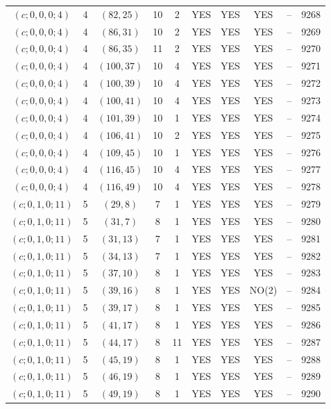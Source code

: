 \begin{longtable}{|c|c|c|c|c|c|c|c|c|c|}
$(c; 0, 0, 0; 4)$ & 4 & $(82, 25)$ & 10 & 2 & YES & YES & YES & -- & 9268\\
$(c; 0, 0, 0; 4)$ & 4 & $(86, 31)$ & 10 & 2 & YES & YES & YES & -- & 9269\\
$(c; 0, 0, 0; 4)$ & 4 & $(86, 35)$ & 11 & 2 & YES & YES & YES & -- & 9270\\
$(c; 0, 0, 0; 4)$ & 4 & $(100, 37)$ & 10 & 4 & YES & YES & YES & -- & 9271\\
$(c; 0, 0, 0; 4)$ & 4 & $(100, 39)$ & 10 & 4 & YES & YES & YES & -- & 9272\\
$(c; 0, 0, 0; 4)$ & 4 & $(100, 41)$ & 10 & 4 & YES & YES & YES & -- & 9273\\
$(c; 0, 0, 0; 4)$ & 4 & $(101, 39)$ & 10 & 1 & YES & YES & YES & -- & 9274\\
$(c; 0, 0, 0; 4)$ & 4 & $(106, 41)$ & 10 & 2 & YES & YES & YES & -- & 9275\\
$(c; 0, 0, 0; 4)$ & 4 & $(109, 45)$ & 10 & 1 & YES & YES & YES & -- & 9276\\
$(c; 0, 0, 0; 4)$ & 4 & $(116, 45)$ & 10 & 4 & YES & YES & YES & -- & 9277\\
$(c; 0, 0, 0; 4)$ & 4 & $(116, 49)$ & 10 & 4 & YES & YES & YES & -- & 9278\\
$(c; 0, 1, 0; 11)$ & 5 & $(29, 8)$ & 7 & 1 & YES & YES & YES & -- & 9279\\
$(c; 0, 1, 0; 11)$ & 5 & $(31, 7)$ & 8 & 1 & YES & YES & YES & -- & 9280\\
$(c; 0, 1, 0; 11)$ & 5 & $(31, 13)$ & 7 & 1 & YES & YES & YES & -- & 9281\\
$(c; 0, 1, 0; 11)$ & 5 & $(34, 13)$ & 7 & 1 & YES & YES & YES & -- & 9282\\
$(c; 0, 1, 0; 11)$ & 5 & $(37, 10)$ & 8 & 1 & YES & YES & YES & -- & 9283\\
$(c; 0, 1, 0; 11)$ & 5 & $(39, 16)$ & 8 & 1 & YES & YES & NO(2) & -- & 9284\\
$(c; 0, 1, 0; 11)$ & 5 & $(39, 17)$ & 8 & 1 & YES & YES & YES & -- & 9285\\
$(c; 0, 1, 0; 11)$ & 5 & $(41, 17)$ & 8 & 1 & YES & YES & YES & -- & 9286\\
$(c; 0, 1, 0; 11)$ & 5 & $(44, 17)$ & 8 & 11 & YES & YES & YES & -- & 9287\\
$(c; 0, 1, 0; 11)$ & 5 & $(45, 19)$ & 8 & 1 & YES & YES & YES & -- & 9288\\
$(c; 0, 1, 0; 11)$ & 5 & $(46, 19)$ & 8 & 1 & YES & YES & YES & -- & 9289\\
$(c; 0, 1, 0; 11)$ & 5 & $(49, 19)$ & 8 & 1 & YES & YES & YES & -- & 9290\\

\end{longtable}
